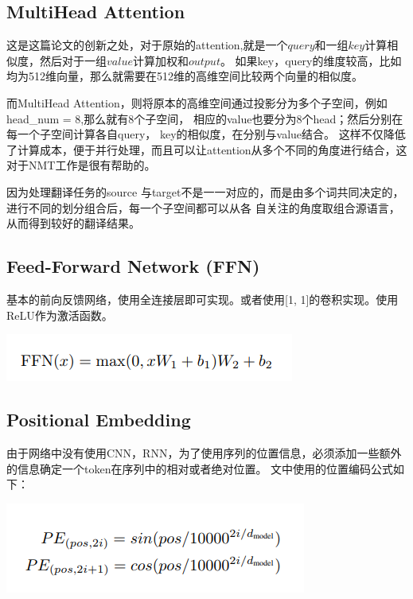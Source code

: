 \documentclass[UTF8,a4paper,10pt]{ctexart}
\begin{document}
\subsection{MultiHead Attention}

这是这篇论文的创新之处，对于原始的attention,就是一个$query$和一组$key$计算相似度，然后对于一组$value$计算加权和$output$。
如果key，query的维度较高，比如均为512维向量，那么就需要在512维的高维空间比较两个向量的相似度。

而MultiHead Attention，则将原本的高维空间通过投影分为多个子空间，例如head\_num = 8,那么就有8个子空间，
相应的value也要分为8个head；然后分别在每一个子空间计算各自query， key的相似度，在分别与value结合。
这样不仅降低了计算成本，便于并行处理，而且可以让attention从多个不同的角度进行结合，这对于NMT工作是很有帮助的。

因为处理翻译任务的source 与target不是一一对应的，而是由多个词共同决定的，进行不同的划分组合后，每一个子空间都可以从各
自关注的角度取组合源语言，从而得到较好的翻译结果。

\subsection{Feed-Forward Network  (FFN)}

基本的前向反馈网络，使用全连接层即可实现。或者使用[1, 1]的卷积实现。使用ReLU作为激活函数。

\centerline{\includegraphics[scale=0.6]{pics/190413-ffn.png}}


\subsection{Positional Embedding}

由于网络中没有使用CNN，RNN，为了使用序列的位置信息，必须添加一些额外的信息确定一个token在序列中的相对或者绝对位置。
文中使用的位置编码公式如下：

\centerline{\includegraphics[scale=0.6]{pics/190413-pos.png}}
\end{document}
